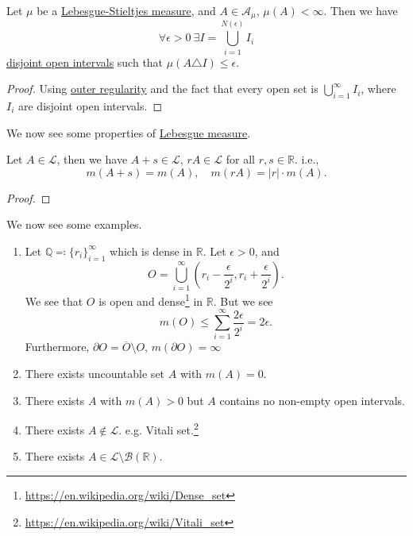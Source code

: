 \begin{proposition}
	Let \(\mu \) be a \hyperref[def:Lebesgue-Stieltjes-measure]{Lebesgue-Stieltjes measure}, and \(A\in \mathcal{A} _\mu \), \(\mu (A)<\infty \). Then we have
	\[
		\forall \epsilon >0\ \exists I = \bigcup\limits_{i=1}^{N(\epsilon )} I_{i}
	\]
	\underline{disjoint open intervals} such that \(\mu (A\triangle  I)\leq \epsilon \).
\end{proposition}
\begin{proof}
	Using \hyperref[thm:outer-regularity]{outer regularity} and the fact that every open set is \(\bigcup\limits_{i=1}^{\infty} I_{i}\), where \(I_{i}\) are disjoint open intervals.
\end{proof}

We now see some properties of \hyperref[def:Lebesgue-measure]{Lebesgue measure}.

\begin{theorem}
	Let \(A\in \mathcal{L}\), then we have \(A + s\in \mathcal{L}\), \(rA\in\mathcal{L}  \) for all \(r, s\in\mathbb{R} \). i.e.,
	\[
		m(A+s) = m(A),\quad m(rA) = \left\vert r \right\vert \cdot m(A).
	\]
\end{theorem}
\begin{proof}
\end{proof}

\begin{eg}
	We now see some examples.
	\begin{enumerate}[(1)]
		\item Let \(\mathbb{Q}\eqqcolon\{r_{i}\}_{i=1}^{\infty}\) which is dense in \(\mathbb{R} \). Let \(\epsilon >0\), and
		      \[
			      O = \bigcup\limits_{i=1}^{\infty} \left(r_{i} - \frac{\epsilon}{2^i}, r_{i} + \frac{\epsilon}{2^i}\right).
		      \]
		      We see that \(O\) is open and dense\footnote{\url{https://en.wikipedia.org/wiki/Dense_set}} in \(\mathbb{R} \). But we see
		      \[
			      m(O) \leq \sum\limits_{i=1}^{\infty} \frac{2\epsilon }{2^i} = 2\epsilon.
		      \]
		      Furthermore, \(\partial O = \overline{O} \setminus O\), \(m(\partial O) = \infty \)
		\item There exists uncountable set \(A\) with \(m(A)=0\).
		\item There exists \(A\) with \(m(A)>0\) but \(A\) contains no non-empty open intervals.
		\item There exists \(A\notin \mathcal{L} \). e.g. Vitali set.\footnote{\url{https://en.wikipedia.org/wiki/Vitali_set}}
		\item There exists \(A\in\mathcal{L} \setminus \mathcal{B} (\mathbb{R} )\).
	\end{enumerate}
\end{eg}